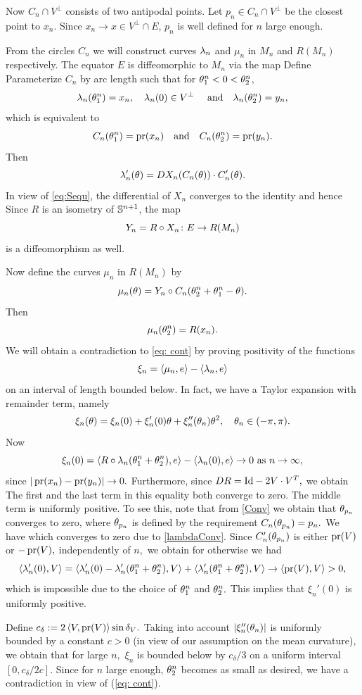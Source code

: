 \documentclass{amsart}
\begin{document}
{Now $C_n \cap V^{\perp}$ consists of two antipodal points. Let $p_n \in C_n \cap V^{\perp}$ be the closest point to $x_n$. Since $x_n \to x \in V^{\perp} \cap E$, $p_n$ is well defined for $n$ large enough.

From the circles $C_n$ we will construct curves $\l_n$ and $\mu_n$ in $M_n$ and $R(M_n)$ respectively. The equator $E$ is diffeomorphic to $M_n$ via the map
Define
Parameterize $C_n$ by arc length such that for $\t_1^n<0<\t_2^n$,
\[\l_n(\t_1^n)=x_n,\quad \l_n(0)\in V^{\perp}\quad~\text{and}\quad \l_n(\t_2^n)=y_n,\]
which is equivalent to
\[C_n(\t^n_1)=\pr(x_n)\quad\text{and}\quad C_n(\t^n_2)=\pr(y_n).\]
Then
\[\l_n'(\t)=DX_n(C_n(\t))\cdot C_n'(\t).\]
In view of \eqref{eq:Sequ}, the differential of $X_n$ converges to the identity and hence
Since $R$ is an isometry of $\S^{n+1}$, the map
\[Y_n=R\circ X_n\cn E\ra R(M_n)\]
is a diffeomorphism as well.

Now define the curves $\mu_n$ in $R(M_n)$ by
\[\mu_n(\t)=Y_n\circ C_n(\t^n_2+\t^n_1-\t).\]
Then
\[\mu_n(\t^n_2)=R(x_n).\]
We will obtain a contradiction to \eqref{eq: cont} by proving positivity of the functions
\[\xi_n=\inpr{\mu_n}{e}-\inpr{\l_n}{e}\]
on an interval of length bounded below.
In fact, we have a Taylor expansion with remainder term, namely
\[\xi_n(\t)=\xi_n(0)+\xi_n'(0)\t+\xi_n''(\t_n)\t^2,\quad \t_n\in (-\pi,\pi).\]
Now
\[\xi_n(0)=\inpr{R\circ\l_n(\t^n_1+\t^n_2)}{e}-\inpr{\l_n(0)}{e}\ra 0~\text{as}~ n\ra\8,\]
since $|\pr(x_n)-\pr(y_n)|\ra 0.$
Furthermore, since $DR=\mrm{Id}-2V\cdot V^{T},$ we obtain
 The first and the last term in this equality both converge to zero. The middle term is uniformly positive. To see this, note that
 from \eqref{Conv} we obtain that $\t_{p_n}$ converges to zero, where $\t_{p_n}$ is defined by the requirement $C_n(\t_{p_n})=p_n.$ We have
which converges to zero due to \eqref{lambdaConv}. Since $C_n'(\t_{p_n})$ is either $\pr(V)$ or $-\pr(V),$ independently of $n,$ we obtain
for otherwise we had
$$\inpr{\l_n'(0)}{V}=\inpr{\l_n'(0)-\l_n'(\t^n_1+\t^n_2)}{V}+\inpr{\l_n'(\t^n_1+\t^n_2)}{V}\ra \inpr{\pr(V)}{V}>0,$$
which is impossible due to the choice of $\t^n_1$ and $\t^n_2.$ This implies that $\xi_n'(0)$ is uniformly positive.

Define $c_{\d}:=2\inpr{V}{\pr(V)}\sin\d_V.$ Taking into account  $|\xi''_{n}(\t_{n})|$ is uniformly bounded by a constant $c>0$ (in view of our assumption on the mean curvature), we obtain that for large $n,$ $\xi_n$ is bounded below by $c_{\delta}/3$ on a uniform interval $[0,c_{\delta}/2c]$. Since for $n$ large enough, $\t_{2}^{n}$ becomes as small as desired, we have a contradiction in view of (\ref{eq: cont}).
}
\end{document}
